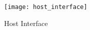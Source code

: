 \begin{figure}[h]
    \centering
    \texttt{[image: host\_interface]}
    \caption{Host Interface}
    \label{fig:2_HI}
\end{figure}